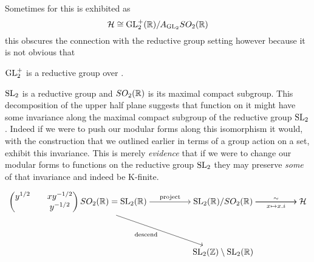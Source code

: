     \begin{remark}
        Sometimes for  this is exhibited as 
        \[\mathcal{H} \cong \GL_2^+(\R)/ A_{\GL_2}SO_2(\R)\]
        this obscures the connection with the reductive group setting however because it is not obvious that 

        \begin{Lemma}
            \(\operatorname{GL}_2^+\) is a reductive group over \Q. 
        \end{Lemma}
    \end{remark}


	
	
	\(\operatorname{SL}_2\) is a reductive group and \(SO_2(\R)\) is its maximal compact subgroup. This decomposition of the upper half plane suggests that function on it might have some invariance along the maximal compact subgroup of the reductive group \(\operatorname{SL}_2\). Indeed if we were to push our modular forms along this isomorphism it would, with the construction that we outlined earlier in terms of a group action on a set, exhibit this invariance. This is merely \textit{evidence} that if we were to change our modular forms to functions on the reductive group \(\operatorname{SL}_2\) they may preserve \textit{some} of that invariance and indeed be K-finite.
    
	\[\begin{tikzcd}[cramped]
		{\begin{pmatrix}y^{1/2} & x y^{-1/2}\\ & y^{-1/2}\end{pmatrix}SO_2(\R)=\SL_2(\R)} && {\SL_2(\R)/SO_2(\R)} && {\mathcal{H}} \\
		\\
		&& {\SL_2(\Z)\setminus\SL_2(\R)}
		\arrow["\sim", from=1-3, to=1-5]
		\arrow["\mathrm{project}", from=1-1, to=1-3]
		\arrow["{x\mapsto x.i}"', from=1-3, to=1-5]
		\arrow["{\text{descend}}"', from=1-1, to=3-3]
	\end{tikzcd}\]

